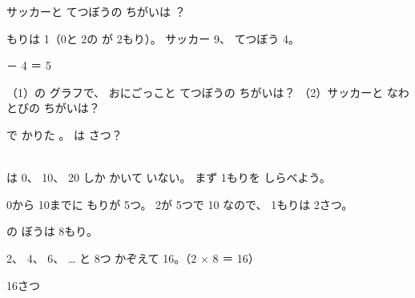 \begin{reidai}[ぼうグラフを よむ]
サッカーと てつぼうの ちがいは ？\par
\noindent\begin{minipage}[c]{0.56\linewidth}\centering
{}
\end{minipage}\hfill
\begin{minipage}[c]{0.42\linewidth}
もりは 1（0と 2の が 2もり）。
サッカー 9、 てつぼう 4。

 － 4 ＝ 5\enspace {}
\end{minipage}
\end{reidai}

\begin{jibun}
（1）の グラフで、 おにごっこと てつぼうの ちがいは？
\bkshikiran
（2）サッカーと なわとびの ちがいは？
\bkshikiran
{}
\end{jibun}

\begin{reidai}
で かりた 。 は さつ？\par\vspace{5mm}
\noindent\begin{minipage}[c]{0.46\linewidth}\centering
{}
\end{minipage}\hfill
\begin{minipage}[c]{0.52\linewidth}
\kangaekata\\
は 0、 10、 20 しか かいて いない。 まず 1もりを しらべよう。
\end{minipage}\par\vspace{2pt}
\begin{enumerate}[label={\bkcircled[bkBlue]{\arabic*}}, leftmargin=2.2\zw, itemsep=0pt, topsep=0pt]
\item 0から 10までに もりが 5つ。 2が 5つで 10 なので、 1もりは 2さつ。
\item {}の ぼうは 8もり。
\item 2、 4、 6、 … と 8つ かぞえて 16。（2 × 8 ＝ 16）
\end{enumerate}
\kotae 16さつ
\end{reidai}

